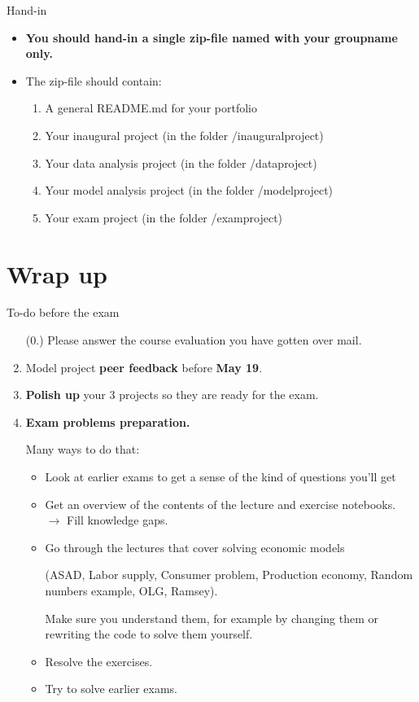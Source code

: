 \documentclass[10pt,english,t,aspectratio=169]{beamer}
\begin{document}
%
\begin{frame}{Hand-in}
\begin{itemize}
\item \textbf{You should hand-in a single zip-file named with your groupname
only.}
\item The zip-file should contain:
\begin{enumerate}
\item A general README.md for your portfolio
\item Your inaugural project (in the folder /inauguralproject)
\item Your data analysis project (in the folder /dataproject)
\item Your model analysis project (in the folder /modelproject)
\item Your exam project (in the folder /examproject)
\end{enumerate}
\end{itemize}
\end{frame}
%







\section{Wrap up}
\begin{frame}{To-do before the exam}
    \begin{enumerate}
        \item[(0.)] Please answer the course evaluation you have gotten over mail.
        \item Model project \textbf{peer feedback} before \textbf{May 19}.
        \item \textbf{Polish up} your 3 projects so they are ready for the exam. 
        \item \textbf{Exam problems preparation.} \par
        Many ways to do that:
        \begin{itemize}
            \item Look at earlier exams to get a sense of the kind of questions you'll get
            \item Get an overview of the contents of the lecture and exercise notebooks. $\rightarrow$ Fill knowledge gaps.
            \item Go through the lectures that cover solving economic models \par 
            (ASAD, Labor supply, Consumer problem, Production economy,  Random numbers example, OLG, Ramsey). \par 
            Make sure you understand them, for example by changing them or rewriting the code to solve them yourself.
            \item Resolve the exercises.
            \item Try to solve earlier exams.
        \end{itemize}
    \end{enumerate}
\end{frame}
\end{document}
